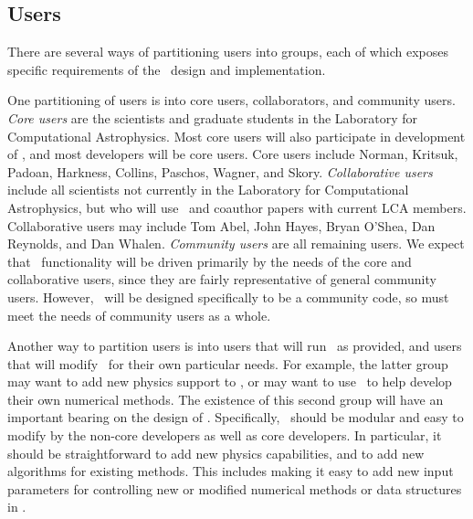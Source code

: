 \documentclass[11pt]{article}
\begin{document}
\subsection{Users}


    There are several ways of partitioning users into groups, each of
    which exposes specific requirements of the \cello\ design and
    implementation.


    One partitioning of users is into core users, collaborators, and
    community users.
%
    \textit{Core users} are the scientists and graduate students in
    the Laboratory for Computational Astrophysics.  Most core users
    will also participate in development of \cello, and most
    developers will be core users.  Core users include Norman,
    Kritsuk, Padoan, Harkness, Collins, Paschos, Wagner, and Skory.
%
    \textit{Collaborative users} include all scientists not currently
    in the Laboratory for Computational Astrophysics, but who will use
    \cello\ and coauthor papers with current LCA members.
    Collaborative users may include Tom Abel, John Hayes, Bryan
    O'Shea, Dan Reynolds, and Dan Whalen.
%
    \textit{Community users} are all remaining users.  We expect that
    \cello\ functionality will be driven primarily by the needs of the
    core and collaborative users, since they are fairly representative
    of general community users.  However, \cello\ will be designed
    specifically to be a community code, so must meet the needs of
    community users as a whole.

    Another way to partition users is into users that will run \cello\
    as provided, and users that will modify \cello\ for their own
    particular needs.  For example, the latter group may want to add
    new physics support to \cello, or may want to use \cello\ to help
    develop their own numerical methods.  The existence of this second
    group will have an important bearing on the design of \cello.
    Specifically, \cello\ should be modular and easy to modify by the
    non-core developers as well as core developers.  In particular, it
    should be straightforward to add new physics capabilities, and to
    add new algorithms for existing methods.  This includes making it
    easy to add new input parameters for controlling new or modified
    numerical methods or data structures in \cello.
\end{document}

